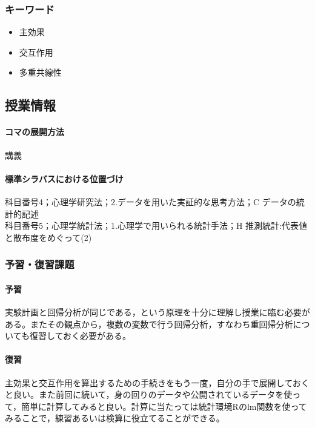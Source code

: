 \subsubsection{キーワード}
\begin{itemize}
\item 主効果
\item 交互作用
\item 多重共線性
\end{itemize}
\subsection{授業情報}
\paragraph{コマの展開方法}
講義
\paragraph{標準シラバスにおける位置づけ}
科目番号4；心理学研究法；2.データを用いた実証的な思考方法；C データの統計的記述\\
科目番号5；心理学統計法；1.心理学で用いられる統計手法；H 推測統計:代表値と散布度をめぐって(2)
\subsubsection{予習・復習課題}
\paragraph{予習}
実験計画と回帰分析が同じである，という原理を十分に理解し授業に臨む必要がある。またその観点から，複数の変数で行う回帰分析，すなわち重回帰分析についても復習しておく必要がある。
\paragraph{復習}
主効果と交互作用を算出するための手続きをもう一度，自分の手で展開しておくと良い。また前回に続いて，身の回りのデータや公開されているデータを使って，簡単に計算してみると良い。計算に当たっては統計環境Rのlm関数を使ってみることで，練習あるいは検算に役立てることができる。